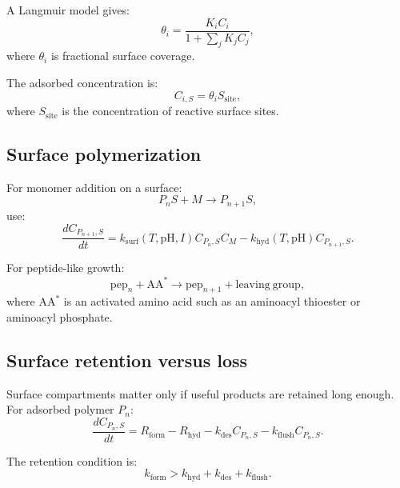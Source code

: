 \documentclass[11pt]{article}
\begin{document}
A Langmuir model gives:
\begin{equation}
    \theta_i =
    \frac{K_i C_i}{1+\sum_j K_j C_j},
\end{equation}
where $\theta_i$ is fractional surface coverage.

The adsorbed concentration is:
\begin{equation}
    C_{i,S} =
    \theta_i S_{\mathrm{site}},
\end{equation}
where $S_{\mathrm{site}}$ is the concentration of reactive surface sites.

\subsection{Surface polymerization}

For monomer addition on a surface:
\begin{equation}
    P_nS + M \rightarrow P_{n+1}S,
\end{equation}
use:
\begin{equation}
    \frac{dC_{P_{n+1},S}}{dt}
    =
    k_{\mathrm{surf}}(T,\mathrm{pH},I)
    C_{P_n,S} C_M
    -
    k_{\mathrm{hyd}}(T,\mathrm{pH})
    C_{P_{n+1},S}.
\end{equation}

For peptide-like growth:
\begin{equation}
    \mathrm{pep}_n + \mathrm{AA}^{*}
    \rightarrow
    \mathrm{pep}_{n+1} + \mathrm{leaving\ group},
\end{equation}
where $\mathrm{AA}^{*}$ is an activated amino acid such as an aminoacyl
thioester or aminoacyl phosphate.

\subsection{Surface retention versus loss}

Surface compartments matter only if useful products are retained long enough.
For adsorbed polymer $P_n$:
\begin{equation}
    \frac{dC_{P_n,S}}{dt}
    =
    R_{\mathrm{form}}
    -
    R_{\mathrm{hyd}}
    -
    k_{\mathrm{des}} C_{P_n,S}
    -
    k_{\mathrm{flush}} C_{P_n,S}.
\end{equation}

The retention condition is:
\begin{equation}
    k_{\mathrm{form}}
    >
    k_{\mathrm{hyd}} + k_{\mathrm{des}} + k_{\mathrm{flush}}.
\end{equation}
\end{document}

